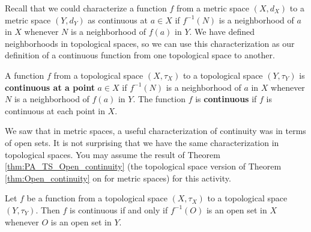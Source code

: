 \label{chap:continuity_topology}


\vspace*{-17 pt}

\vspace*{13 pt}

\label{sec_cont_top_intro}

Recall that we could characterize a function $f$ from a metric space $(X,d_X)$ to a metric space $(Y,d_Y)$ as continuous at $a \in X$ if $f^{-1}(N)$ is a neighborhood of $a$ in $X$ whenever $N$ is a neighborhood of $f(a)$ in $Y$. We have defined neighborhoods in topological spaces, so we can use this characterization as our definition of a continuous function from one topological space to another. 

\begin{definition} \label{def:Continuity_topology} A function $f$ from a topological space $(X, \tau_X)$ to a topological space $(Y, \tau_Y)$ is \textbf{continuous at a point} $a \in X$ if $f^{-1}(N)$ is a neighborhood of $a$ in $X$ whenever $N$ is a neighborhood of $f(a)$ in $Y$. The function $f$ is \textbf{continuous} if $f$ is continuous at each point in $X$.
\end{definition}

We saw that in metric spaces, a useful characterization of continuity was in terms of open sets. It is not surprising that we have the same characterization in topological spaces. You may assume the result of Theorem \ref{thm:PA_TS_Open_continuity} (the topological space version of Theorem \ref{thm:Open_continuity} on \pageref{thm:Open_continuity} for metric spaces) for this activity. 

\begin{theorem} \label{thm:PA_TS_Open_continuity} Let $f$ be a function from a topological space $(X,\tau_X)$ to a topological space $(Y,\tau_Y)$. Then $f$ is continuous if and only if $f^{-1}(O)$ is an open set in $X$ whenever $O$ is an open set in $Y$.  
\end{theorem}

